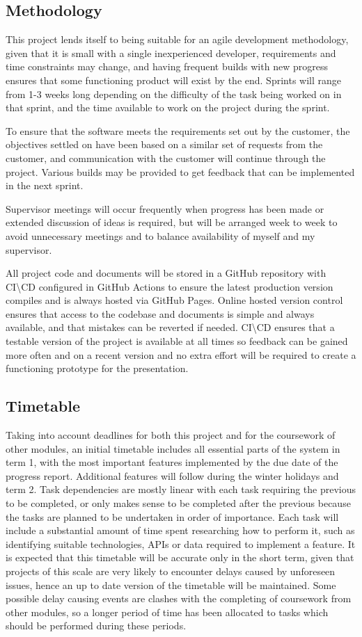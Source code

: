 \subsection{Methodology}
This project lends itself to being suitable for an agile development methodology, given that it is small with a single inexperienced developer, requirements and time constraints may change, and having frequent builds with new progress ensures that some functioning product will exist by the end. Sprints will range from 1-3 weeks long depending on the difficulty of the task being worked on in that sprint, and the time available to work on the project during the sprint. 

To ensure that the software meets the requirements set out by the customer, the objectives settled on have been based on a similar set of requests from the customer, and communication with the customer will continue through the project. Various builds may be provided to get feedback that can be implemented in the next sprint.

Supervisor meetings will occur frequently when progress has been made or extended discussion of ideas is required, but will be arranged week to week to avoid unnecessary meetings and to balance availability of myself and my supervisor.

All project code and documents will be stored in a GitHub repository with CI\textbackslash CD configured in GitHub Actions to ensure the latest production version compiles and is always hosted via GitHub Pages. Online hosted version control ensures that access to the codebase and documents is simple and always available, and that mistakes can be reverted if needed. CI\textbackslash CD ensures that a testable version of the project is available at all times so feedback can be gained more often and on a recent version and no extra effort will be required to create a functioning prototype for the presentation.

\subsection{Timetable}
Taking into account deadlines for both this project and for the coursework of other modules, an initial timetable includes all essential parts of the system in term 1, with the most important features implemented by the due date of the progress report. Additional features will follow during the winter holidays and term 2. Task dependencies are mostly linear with each task requiring the previous to be completed, or only makes sense to be completed after the previous because the tasks are planned to be undertaken in order of importance. Each task will include a substantial amount of time spent researching how to perform it, such as identifying suitable technologies, APIs or data required to implement a feature. It is expected that this timetable will be accurate only in the short term, given that projects of this scale are very likely to encounter delays caused by unforeseen issues, hence an up to date version of the timetable will be maintained. Some possible delay causing events are clashes with the completing of coursework from other modules, so a longer period of time has been allocated to tasks which should be performed during these periods.

